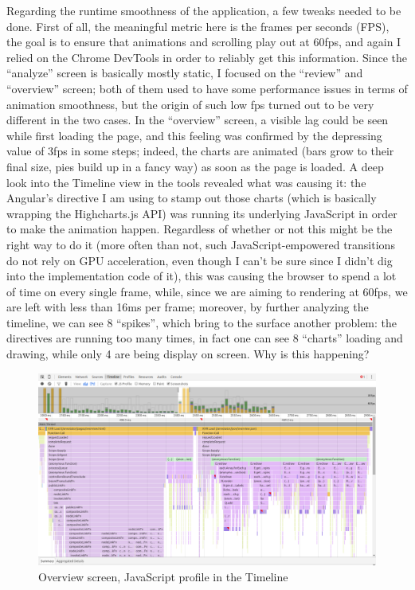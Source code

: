 \documentclass[12pt,oneside,svgnames]{memoir}
\begin{document}
Regarding the runtime smoothness of the application, a few tweaks needed
to be done. First of all, the meaningful metric here is the frames per
seconds (FPS), the goal is to ensure that animations and scrolling play
out at 60fps, and again I relied on the Chrome DevTools in order to
reliably get this information. Since the ``analyze'' screen is basically
mostly static, I focused on the ``review'' and ``overview'' screen; both
of them used to have some performance issues in terms of animation
smoothness, but the origin of such low fps turned out to be very
different in the two cases. In the ``overview'' screen, a visible lag
could be seen while first loading the page, and this feeling was
confirmed by the depressing value of 3fps in some steps; indeed, the
charts are animated (bars grow to their final size, pies build up in a
fancy way) as soon as the page is loaded. A deep look into the Timeline
view in the tools revealed what was causing it: the Angular's directive
I am using to stamp out those charts (which is basically wrapping the
Highcharts.js API) was running its underlying JavaScript in order to
make the animation happen. Regardless of whether or not this might be
the right way to do it (more often than not, such JavaScript-empowered
transitions do not rely on GPU acceleration, even though I can't be sure
since I didn't dig into the implementation code of it), this was causing
the browser to spend a lot of time on every single frame, while, since
we are aiming to rendering at 60fps, we are left with less than 16ms per
frame; moreover, by further analyzing the timeline, we can see 8
``spikes'', which bring to the surface another problem: the directives
are running too many times, in fact one can see 8 ``charts'' loading and
drawing, while only 4 are being display on screen. Why is this
happening?

\begin{figure}[htbp]
\centering
\includegraphics{./src/img/overview-jsprofile.png}
\caption{Overview screen, JavaScript profile in the Timeline}
\end{figure}
\end{document}
